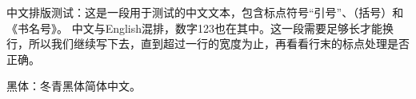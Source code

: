 \documentclass{article}
\begin{document}
中文排版测试：这是一段用于测试的中文文本，包含标点符号“引号”、（括号）和《书名号》。
中文与English混排，数字123也在其中。这一段需要足够长才能换行，所以我们继续写下去，直到超过一行的宽度为止，再看看行末的标点处理是否正确。

\textsf{黑体：冬青黑体简体中文。}
\end{document}
